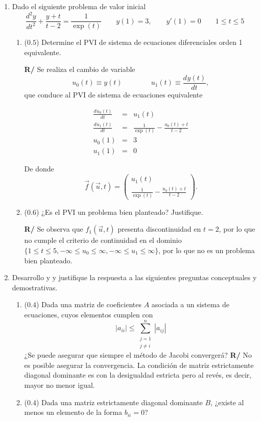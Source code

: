 \documentclass[12pt]{article}
\newcommand{\diff}[3]{\frac{d^{#3} #1}{d#2^{#3}}}
\begin{document}
  \begin{enumerate}[leftmargin=*,widest=9]
  
    \item Dado el siguiente problema de valor inicial
    \[
    \diff{y}{t}{2} + \frac{y+t}{t-2} = \frac{1}{\exp(t)} \qquad y(1) = 3, \qquad y\prime(1) = 0 \qquad 1 \leq t \leq 5
    \]     
    
    \begin{enumerate}[label=\alph*]
    \item (\(0.5\)) Determine el PVI de sistema de ecuaciones diferenciales orden 1 equivalente.
    
    \textbf{R/}    Se realiza el cambio de variable
   \[u_0(t) \equiv y(t) \qquad \qquad u_1(t) \equiv \diff{y(t)}{t}{}, \]
   que conduce al PVI de sistema de ecuaciones equivalente
   
   \begin{eqnarray*}
   \diff{u_0(t)}{t}{} &=& u_1(t)\\
   \diff{u_1(t)}{t}{} &=& \frac{1}{\exp(t)}-\frac{u_0(t)+t}{t-2}\\
   u_0(1) &=& 3 \\
   u_1(1) &=& 0
   \end{eqnarray*}
   
   De donde
   \[ \vec{f}(\vec{u}, t) = \begin{pmatrix}
   u_1(t) \\ \frac{1}{\exp(t)}-\frac{u_0(t)+t}{t-2}
\end{pmatrix}  .  \]
    \item (\(0.6\)) ¿Es el PVI un problema bien planteado? Justifique.
    
    \textbf{R/} Se observa que \(f_1(\vec{u},t)\) presenta discontinuidad en \(t= 2\), por lo que no cumple el criterio de continuidad en el dominio \(\lbrace 1 \leq t \leq 5, -\infty \leq u_0 \leq \infty, -\infty \leq u_1 \leq \infty \rbrace \), por lo que no es un problema bien planteado.
    
    \end{enumerate}
    \item Desarrollo y y justifique la respuesta a las siguientes preguntas conceptuales y demostrativas.
    \begin{enumerate}[label=\alph*]
    \item (\(0.4\)) Dada una matriz de coeficientes \(A\) asociada a un sistema de ecuaciones, cuyos elementos cumplen con 
\[
|a_{ii}| \leq \sum\limits_{\substack{j=1\\j\neq i}}^{n} |a_{ij}|
\]    
¿Se puede asegurar que siempre el método de Jacobi convergerá?
\textbf{R/} No es posible asegurar la convergencia. La condición de matriz estrictamente diagonal dominante es con la desigualdad estricta pero al revés, es decir, mayor no menor igual.
    \item (\(0.4\)) Dada una matriz estrictamente diagonal dominante \(B\), ¿existe al menos un elemento de la forma \(b_{ii} = 0\)?
   

\end{enumerate}
\end{enumerate}
\end{document}
